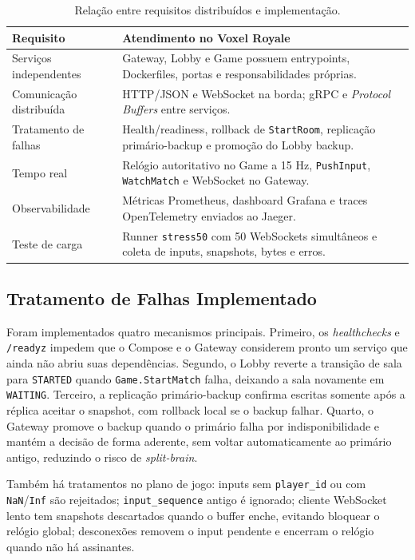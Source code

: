 \documentclass[portuguese]{sbcreviews-2025}%
\begin{document}
\begin{table}[ht]
\centering
\caption{Relação entre requisitos distribuídos e implementação.}
\label{tab:requisitos}
\scriptsize
\begin{tabularx}{\columnwidth}{|X|X|}
\hline
\textbf{Requisito} & \textbf{Atendimento no Voxel Royale} \\ \hline
Serviços independentes & Gateway, Lobby e Game possuem entrypoints, Dockerfiles, portas e responsabilidades próprias. \\ \hline
Comunicação distribuída & HTTP/JSON e WebSocket na borda; gRPC e \textit{Protocol Buffers} entre serviços. \\ \hline
Tratamento de falhas & Health/readiness, rollback de \texttt{StartRoom}, replicação primário-backup e promoção do Lobby backup. \\ \hline
Tempo real & Relógio autoritativo no Game a 15 Hz, \texttt{PushInput}, \texttt{WatchMatch} e WebSocket no Gateway. \\ \hline
Observabilidade & Métricas Prometheus, dashboard Grafana e traces OpenTelemetry enviados ao Jaeger. \\ \hline
Teste de carga & Runner \texttt{stress50} com 50 WebSockets simultâneos e coleta de inputs, snapshots, bytes e erros. \\ \hline
\end{tabularx}
\end{table}

\subsection{Tratamento de Falhas Implementado}

Foram implementados quatro mecanismos principais. Primeiro, os \textit{healthchecks} e \texttt{/readyz} impedem que o Compose e o Gateway considerem pronto um serviço que ainda não abriu suas dependências. Segundo, o Lobby reverte a transição de sala para \texttt{STARTED} quando \texttt{Game.StartMatch} falha, deixando a sala novamente em \texttt{WAITING}. Terceiro, a replicação primário-backup confirma escritas somente após a réplica aceitar o snapshot, com rollback local se o backup falhar. Quarto, o Gateway promove o backup quando o primário falha por indisponibilidade e mantém a decisão de forma aderente, sem voltar automaticamente ao primário antigo, reduzindo o risco de \textit{split-brain}.

Também há tratamentos no plano de jogo: inputs sem \texttt{player\_id} ou com \texttt{NaN}/\texttt{Inf} são rejeitados; \texttt{input\_sequence} antigo é ignorado; cliente WebSocket lento tem snapshots descartados quando o buffer enche, evitando bloquear o relógio global; desconexões removem o input pendente e encerram o relógio quando não há assinantes.
\end{document}
